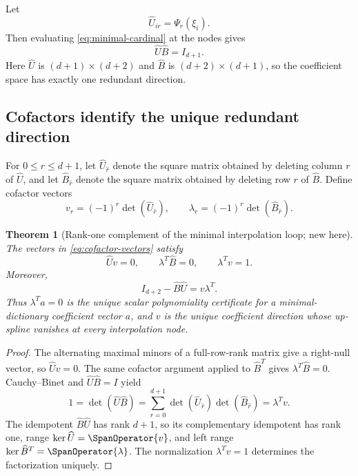 \documentclass[11pt]{article}
\newtheorem{theorem}{Theorem}[section]
\theoremstyle{definition}
\theoremstyle{remark}
\begin{document}
Let
\begin{equation}
 \widehat U_{ir}=\Psi_r(\xi_i).
 \label{eq:Uhat}
\end{equation}
Then evaluating \eqref{eq:minimal-cardinal} at the nodes gives
\begin{equation}
 \widehat U\widehat B=I_{d+1}.
 \label{eq:UhatBhat}
\end{equation}
Here $\widehat U$ is $(d+1)\times(d+2)$ and $\widehat B$ is
$(d+2)\times(d+1)$, so the coefficient space has exactly one redundant
direction.

\subsection{Cofactors identify the unique redundant direction}

For $0\le r\le d+1$, let $\widehat U_{\widehat r}$ denote the square matrix
obtained by deleting column $r$ of $\widehat U$, and let
$\widehat B_{\widehat r}$ denote the square matrix obtained by deleting row
$r$ of $\widehat B$.  Define cofactor vectors
\begin{equation}
 v_r=(-1)^r\det(\widehat U_{\widehat r}),
 \qquad
 \lambda_r=(-1)^r\det(\widehat B_{\widehat r}).
 \label{eq:cofactor-vectors}
\end{equation}

\begin{theorem}[Rank-one complement of the minimal interpolation loop; new here]
\label{thm:rank-one}
The vectors in \eqref{eq:cofactor-vectors} satisfy
\begin{equation}
 \widehat Uv=0,
 \qquad
 \lambda^T\widehat B=0,
 \qquad
 \lambda^Tv=1.
 \label{eq:cofactor-null}
\end{equation}
Moreover,
\begin{equation}
 \boxed{
 I_{d+2}-\widehat B\widehat U=v\lambda^T.}
 \label{eq:rank-one-factorization}
\end{equation}
Thus $\lambda^Ta=0$ is the unique scalar polynomiality certificate for a
minimal-dictionary coefficient vector $a$, and $v$ is the unique coefficient
direction whose up-spline vanishes at every interpolation node.
\end{theorem}

\begin{proof}
The alternating maximal minors of a full-row-rank matrix give a right-null
vector, so $\widehat Uv=0$.  The same cofactor argument applied to
$\widehat B^T$ gives $\lambda^T\widehat B=0$.  Cauchy--Binet and
$\widehat U\widehat B=I$ yield
\[
 1=\det(\widehat U\widehat B)
 =\sum_{r=0}^{d+1}
 \det(\widehat U_{\widehat r})\det(\widehat B_{\widehat r})
 =\lambda^Tv.
\]
The idempotent $\widehat B\widehat U$ has rank $d+1$, so its complementary
idempotent has rank one, range $\ker\widehat U=\SpanOperator\{v\}$, and left range
$\ker\widehat B^T=\SpanOperator\{\lambda\}$.  The normalization
$\lambda^Tv=1$ determines the factorization uniquely.
\end{proof}
\end{document}
